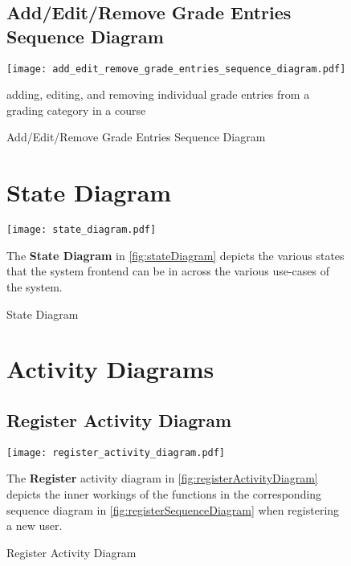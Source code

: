 \documentclass[12pt]{article}
\begin{document}
\begin{figure}[p!]
  \subsection{Add/Edit/Remove Grade Entries Sequence Diagram}
  \centering
  \texttt{[image: add\_edit\_remove\_grade\_entries\_sequence\_diagram.pdf]}
  \caption{Add/Edit/Remove Grade Entries Sequence Diagram}
  \label{fig:addEditRemoveGradeEntriesSequenceDiagram}
  {adding, editing, and removing individual grade entries from a grading category in a course}
\end{figure}

\begin{figure}[p!]
  \section{State Diagram}
  \centering
  \texttt{[image: state\_diagram.pdf]}
  \caption{State Diagram}
  \label{fig:stateDiagram}
  \begin{justify}
      The \textbf{State Diagram} in \autoref{fig:stateDiagram} depicts the various states that
      the system frontend can be in across the various use-cases of the system.
    \end{justify}
\end{figure}

\newcommand{\actdiades}[4]{
    \begin{justify}
      The \textbf{#1} activity diagram in \autoref{fig:#2} depicts the inner workings of the
      functions in the corresponding sequence diagram in \autoref{fig:#3} when #4.
    \end{justify}
}

\newcommand{\actdia}[6]{
  \begin{figure}[p!]
    \subsection{#1 Activity Diagram}
    \centering
    \texttt{[image: \#3]}
    \caption{#1 Activity Diagram}
    \label{fig:#4}
    \actdiades{#1}{#4}{#5}{#6}
  \end{figure}
}

\begin{figure}[p!]
  \section{Activity Diagrams}
  \subsection{Register Activity Diagram}
  \centering
  \texttt{[image: register\_activity\_diagram.pdf]}
  \caption{Register Activity Diagram}
  \label{fig:registerActivityDiagram}
  \actdiades{Register}{registerActivityDiagram}{registerSequenceDiagram}{registering a new user}
\end{figure}
\end{document}
